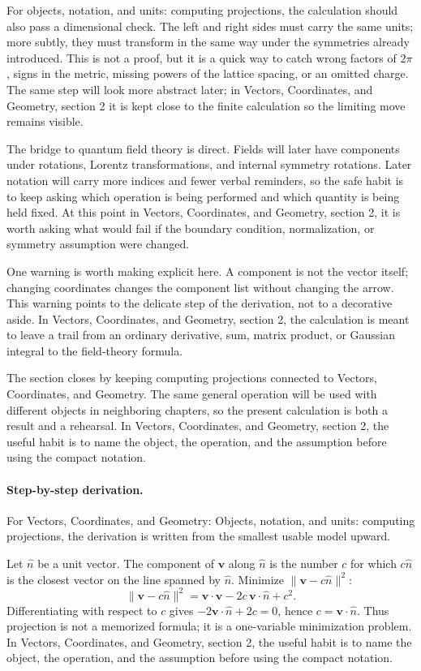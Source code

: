 For objects, notation, and units: computing projections, the calculation should also pass a dimensional check.  The left and right sides must carry the same units; more subtly, they must transform in the same way under the symmetries already introduced.  This is not a proof, but it is a quick way to catch wrong factors of \(2\pi\), signs in the metric, missing powers of the lattice spacing, or an omitted charge.  The same step will look more abstract later; in Vectors, Coordinates, and Geometry, section 2 it is kept close to the finite calculation so the limiting move remains visible.

The bridge to quantum field theory is direct.  Fields will later have components under rotations, Lorentz transformations, and internal symmetry rotations.  Later notation will carry more indices and fewer verbal reminders, so the safe habit is to keep asking which operation is being performed and which quantity is being held fixed.  At this point in Vectors, Coordinates, and Geometry, section 2, it is worth asking what would fail if the boundary condition, normalization, or symmetry assumption were changed.

One warning is worth making explicit here.  A component is not the vector itself; changing coordinates changes the component list without changing the arrow.  This warning points to the delicate step of the derivation, not to a decorative aside.  In Vectors, Coordinates, and Geometry, section 2, the calculation is meant to leave a trail from an ordinary derivative, sum, matrix product, or Gaussian integral to the field-theory formula.

The section closes by keeping computing projections connected to Vectors, Coordinates, and Geometry.  The same general operation will be used with different objects in neighboring chapters, so the present calculation is both a result and a rehearsal.  In Vectors, Coordinates, and Geometry, section 2, the useful habit is to name the object, the operation, and the assumption before using the compact notation.



\paragraph{Step-by-step derivation.}

For Vectors, Coordinates, and Geometry: Objects, notation, and units: computing projections, the derivation is written from the smallest usable model upward.

Let \(\hat n\) be a unit vector.  The component of \(\bm v\) along \(\hat n\) is the number \(c\) for which \(c\hat n\) is the closest vector on the line spanned by \(\hat n\).  Minimize \(\|\bm v-c\hat n\|^2\):
\[
  \|\bm v-c\hat n\|^2=\bm v\cdot\bm v-2c\,\bm v\cdot\hat n+c^2.
\]
Differentiating with respect to \(c\) gives \(-2\bm v\cdot\hat n+2c=0\), hence \(c=\bm v\cdot\hat n\).  Thus projection is not a memorized formula; it is a one-variable minimization problem.  In Vectors, Coordinates, and Geometry, section 2, the useful habit is to name the object, the operation, and the assumption before using the compact notation.

